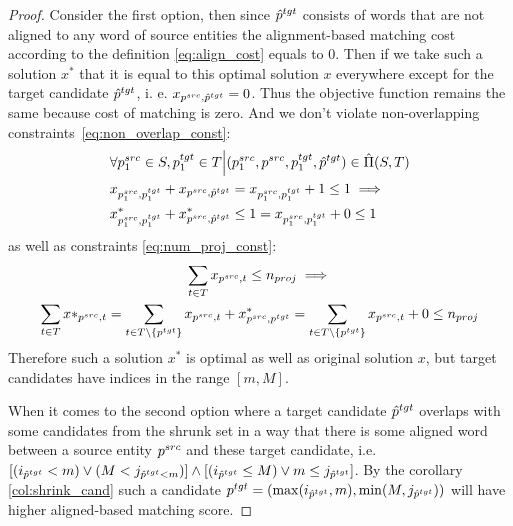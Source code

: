 \begin{proof}
  Consider the first option, then since \( \hat{p}^{tgt}  \) consists of words that are not aligned to any word
  of source entities the alignment-based matching cost according to the definition \eqref{eq:align_cost} equals to \( 0 \).
  Then if we take such a solution \( x^* \) that it is equal to this optimal solution \( x \) everywhere except
  for the target candidate \( \hat{p}^{tgt}  \), i. e. \( x_{p^{src}, \hat{p}^{tgt}} = 0 \). Thus the objective function
  remains the same because cost of matching is zero. And we don't violate non-overlapping constraints~\eqref{eq:non_overlap_const}:
  \begin{align*}
    & \forall p_1^{src} \in S, p_1^{tgt} \in T \Big| (p_1^{src}, p^{src}, p_1^{tgt}, \hat{p}^{tgt}) \in \hat{\Pi}(S, T) \\
    & x_{p_1^{src}, p_1^{tgt}} + x_{p^{src}, \hat{p}^{tgt}} =
    x_{p_1^{src}, p_1^{tgt}} + 1 \leq 1 \implies                                                                         \\
    & x^*_{p_1^{src}, p_1^{tgt}} + x^*_{p^{src}, \hat{p}^{tgt}} \leq 1 =
    x_{p_1^{src}, p_1^{tgt}} + 0 \leq 1
  \end{align*}
  as well as constraints \eqref{eq:num_proj_const}:
  \begin{multline*}
    \sum\limits_{t \in T} x_{p^{src}, t} \leq n_{proj} \implies                             \\
    \sum\limits_{t \in T} x*_{p^{src}, t} =
    \sum\limits_{t \in T \setminus \{ p^{tgt} \}} x_{p^{src}, t} + x^*_{p^{src}, p^{tgt}} =
    \sum\limits_{t \in T \setminus \{ p^{tgt} \}} x_{p^{src}, t} + 0 \leq n_{proj}
  \end{multline*}
  Therefore such a solution \( x^* \) is optimal as well as original solution \( x \), but
  target candidates have indices in the range \( [m, M] \).

  When it comes to the second option where a target candidate \( \hat{p}^{tgt} \) overlaps with some
  candidates from the shrunk set in a way that there is some aligned word between a source entity \( p^{src} \) and these target candidate, i.e.
  \( \left[ (i_{\hat{p}^{tgt}} < m) \lor (M < j_{\hat{p}^{tgt} < m}) \right] \land
  \left[ (i_{\hat{p}^{tgt}} \leq M) \lor m \leq j_{\hat{p}^{tgt}} \right] \).
  By the corollary \ref{col:shrink_cand} such a candidate \( p^{tgt} = ( \max(i_{\hat{p}^{tgt}}, m), \min(M, j_{\hat{p}^{tgt}}) ) \) will have
  higher aligned-based matching score.


\end{proof}
